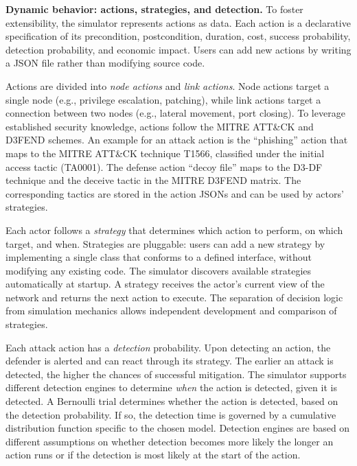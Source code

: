 \documentclass{llncs}
\begin{document}
\textbf{Dynamic behavior: actions, strategies, and detection.}
To foster extensibility, the simulator represents actions as data. Each action is a declarative specification of its precondition, postcondition, duration, cost, success probability, detection probability, and economic impact. Users can add new actions by writing a JSON file rather than modifying source code.

Actions are divided into \emph{node actions} and \emph{link actions}. Node actions target a single node (e.g., privilege escalation, patching), while link actions target a connection between two nodes (e.g., lateral movement, port closing). To leverage established security knowledge, actions follow the MITRE ATT\&CK and D3FEND schemes. An example for an attack action is the ``phishing'' action that maps to the MITRE ATT\&CK technique T1566, classified under the initial access tactic (TA0001). The defense action ``decoy file'' maps to the D3-DF technique and the deceive tactic in the MITRE D3FEND matrix. The corresponding tactics are stored in the action JSONs and can be used by actors' strategies.

Each actor follows a \emph{strategy} that determines which action to perform, on which target, and when. Strategies are pluggable: users can add a new strategy by implementing a single class that conforms to a defined interface, without modifying any existing code. The simulator discovers available strategies automatically at startup. A strategy receives the actor's current view of the network and returns the next action to execute. The separation of decision logic from simulation mechanics allows independent development and comparison of strategies.

Each attack action has a \emph{detection} probability. Upon detecting an action, the defender is alerted and can react through its strategy. The %
earlier an attack is detected, the higher the chances of successful mitigation.
The simulator supports different detection engines to determine \emph{when} the action is detected, given it is detected. A Bernoulli trial determines whether the action is detected, based on the detection probability. If so, the detection time is governed by a cumulative distribution function specific to the chosen model. Detection engines are based on different assumptions on whether detection becomes more likely the longer an action runs or if the detection is most likely at the start of the action.
\end{document}
